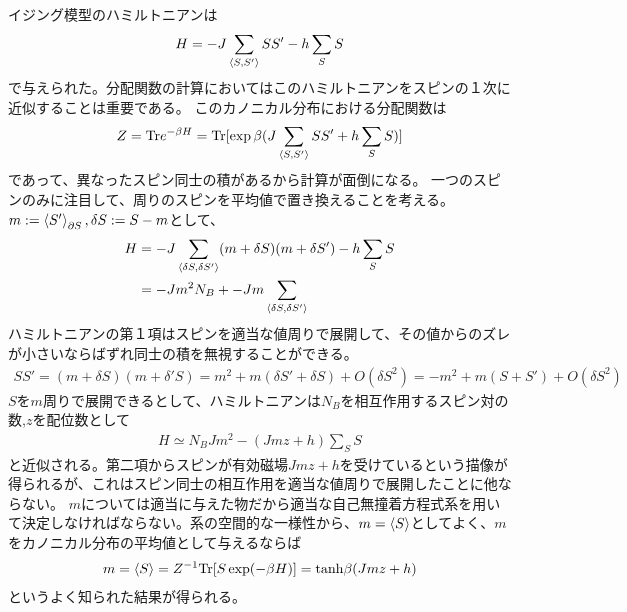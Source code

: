 \documentclass[autodetect-engine,dvipdfmx-if-dvi,ja=standard]{bxjsarticle}
\theoremstyle{break}
\begin{document}
            イジング模型のハミルトニアンは
            \begin{align}
                H=-J\sum_{\braket{S,S'}}S S' -h\sum_S S
            \end{align}
            で与えられた。分配関数の計算においてはこのハミルトニアンをスピンの１次に近似することは重要である。
            このカノニカル分布における分配関数は
            \begin{align}
                Z=\mathrm{Tr}{e^{-\beta H}}=\mathrm{Tr}[\exp\beta (J\sum_{\braket{S,S'}}S S' +h\sum_S S)]
            \end{align}
            であって、異なったスピン同士の積があるから計算が面倒になる。
            \fi
            一つのスピンのみに注目して、周りのスピンを平均値で置き換えることを考える。$m:=\braket{S'}_{\partial S},\delta S:=S-m$として、
            \begin{align}
                H&=-J\sum_{\braket{\delta S,\delta S'}}(m+\delta S) (m+\delta S') -h\sum_S S\\
                &=-Jm^2 N_B +-Jm\sum_{\braket{\delta S,\delta S'}}
            \end{align}
            \fi
            ハミルトニアンの第１項はスピンを適当な値周りで展開して、その値からのズレが小さいならばずれ同士の積を無視することができる。
            \begin{align}
                SS'=(m+\delta S)(m+\delta 'S)=m^2+m(\delta S' +\delta S) +O(\delta S^2)=-m^2+m(S+S')+O(\delta S^2)
            \end{align}
            $S$を$m$周りで展開できるとして、ハミルトニアンは$N_B$を相互作用するスピン対の数,$z$を配位数として
            \begin{align}
                H\simeq N_B Jm^2 -(Jmz+h)\sum_{S}S
            \end{align}
            と近似される。第二項からスピンが有効磁場$Jmz+h$を受けているという描像が得られるが、これはスピン同士の相互作用を適当な値周りで展開したことに他ならない。
            $m$については適当に与えた物だから適当な自己無撞着方程式系を用いて決定しなければならない。系の空間的な一様性から、$m=\braket{S}$としてよく、$m$をカノニカル分布の平均値として与えるならば
            \begin{align}
                m=\braket{S}=Z^{-1}\mathrm{Tr}[S\exp(-\beta H)]=\mathrm{tanh}\beta(Jmz+h)\label{1}
            \end{align}
            というよく知られた結果が得られる。
\end{document}
